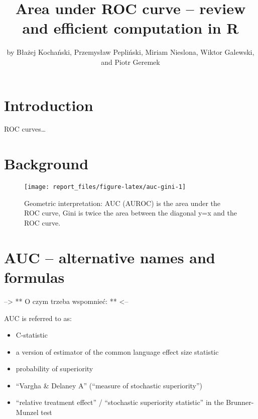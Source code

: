 \title{Area under ROC curve -- review and efficient computation in R}


\author{by Błażej Kochański, Przemysław Pepliński, Miriam Nieslona, Wiktor Galewski, and Piotr Geremek}

\maketitle


\section{Introduction}\label{introduction}

ROC curves\ldots{}

\section{Background}\label{background}

\begin{figure}

{\centering \texttt{[image: report\_files/figure-latex/auc-gini-1]} 

}

\caption{Geometric interpretation: AUC (AUROC) is the area under the ROC curve, Gini is twice the area between the diagonal y=x and the ROC curve.}\label{fig:auc-gini}
\end{figure}

\section{AUC -- alternative names and formulas}\label{auc-alternative-names-and-formulas}

--\textgreater{} ** O czym trzeba wspomnieć: ** \textless--

AUC is referred to as:

\begin{itemize}
\tightlist
\item
  C-statistic
\item
  a version of estimator of the common language effect size statistic
\item
  probability of superiority
\item
  ``Vargha \& Delaney A'' (``measure of stochastic superiority'') \citep{Vargha_Delaney_2000}
\item
  ``relative treatment effect'' / ``stochastic superiority statistic'' in the Brunner-Munzel test
\end{itemize}

